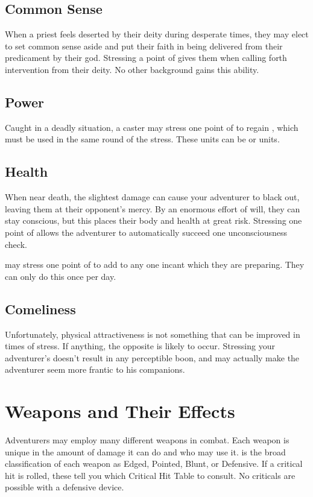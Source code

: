 \begin{multicols}{2}
\subsection{Common Sense}
When a priest feels deserted by their deity during desperate times, they may elect to set common sense aside and put their faith in being delivered from their predicament by their god. Stressing a point of \CSE gives them  when calling forth intervention from their deity. No other background gains this ability.
\subsection{Power}
Caught in a deadly situation, a caster may stress one point of \PWR to regain , which must be used in the same round of the stress. These units can be  or  units.
\subsection{Health}
When near death, the slightest damage can cause your adventurer to black out, leaving them at their opponent's mercy. By an enormous effort of will, they can stay conscious, but this places their body and health at great risk. Stressing one point of \HEA allows the adventurer to automatically succeed one unconsciousness check.

 may stress one point of \HEA to add  to any one incant which they are preparing. They can only do this once per day.
\subsection{Comeliness}
Unfortunately, physical attractiveness is not something that can be improved in times of stress. If anything, the opposite is likely to occur. Stressing your adventurer's \COM doesn't result in any perceptible boon, and may actually make the adventurer seem more frantic to his companions.
\section{Weapons and Their Effects}
Adventurers may employ many different weapons in combat. Each weapon is unique in the amount of damage it can do and who may use it.
 is the broad classification of each
weapon as Edged, Pointed, Blunt, or Defensive. If a critical hit is rolled, these tell you which Critical Hit Table to consult. No criticals are possible with a defensive device.


\end{multicols}
